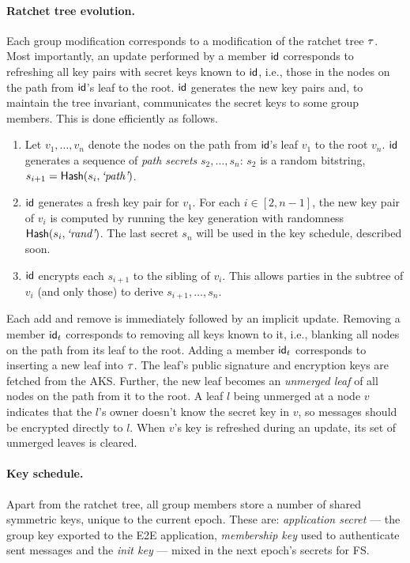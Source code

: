 \paragraph{Ratchet tree evolution.}
Each group modification corresponds to a modification of the ratchet tree $\tau$. Most importantly, an update performed by a member ${\mathsf{id}}$ corresponds to refreshing all key pairs with secret keys known to ${\mathsf{id}}$, i.e., those in the nodes on the path from ${\mathsf{id}}$'s leaf to the root. ${\mathsf{id}}$ generates the new key pairs and, to maintain the tree invariant, communicates the secret keys to some group members. This is done efficiently as follows.
\begin{enumerate}[itemsep=1pt,topsep=1pt,parsep=1pt]
  \item Let $v_1, \dots, v_n$ denote the nodes on the path from ${\mathsf{id}}$'s leaf $v_1$ to the root $v_n$.
  ${\mathsf{id}}$ generates a sequence of \emph{path secrets} $s_2, \dots, s_n$: $s_2$ is a random bitstring, $s_{i+1} = {\mathsf{Hash}}(s_i,{\text{\normalfont \it`path'}})$.
  \item ${\mathsf{id}}$ generates a fresh key pair for $v_1$. For each $i\in[2,n-1]$, the new key pair of $v_i$ is computed by
    running the key generation with randomness ${\mathsf{Hash}}(s_i,{\text{\normalfont \it`rand'}})$. The last secret $s_n$ will be used in the key schedule, described soon.
  \item ${\mathsf{id}}$ encrypts each $s_{i+1}$ to the sibling of $v_i$. This allows parties in the subtree of $v_i$ (and only those) to derive $s_{i+1}, \dots, s_n$.
\end{enumerate}

Each add and remove is immediately followed by an implicit update.
Removing a member ${\mathsf{id}}_t$ corresponds to removing all keys known to it, i.e., blanking all nodes on the path from its leaf to the root.
%
Adding a member ${\mathsf{id}}_t$ corresponds to inserting a new leaf into $\tau$. The leaf's public signature and encryption keys are fetched from the AKS. Further, the new leaf becomes an \emph{unmerged leaf} of all nodes on the path from it to the root. A leaf $l$ being unmerged at a node $v$ indicates that the $l$'s owner doesn't know the secret key in $v$, so messages should be encrypted directly to $l$. When $v$'s key is refreshed during an update, its set of unmerged leaves is cleared.

\paragraph{Key schedule.}
Apart from the ratchet tree, all group members store a number of shared symmetric keys, unique to the current epoch. These are: \emph{application secret} --- the group key exported to the E2E application,  \emph{membership key} used to authenticate sent messages and the \emph{init key} --- mixed in the next epoch's secrets for FS.

